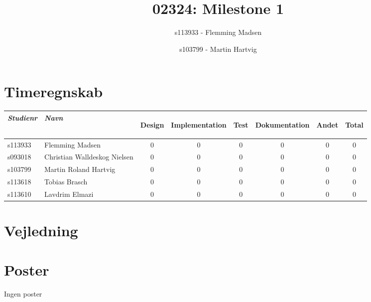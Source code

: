 \documentclass[a4paper]{article}
\title{02324: Milestone 1}
\author{
  s113933 - Flemming Madsen
  \and
    s103799 - Martin Hartvig
}
\begin{document}
\section*{Timeregnskab} %
\label{sec:Timeregnskab}
\begin{tabular}{l l | c c c c c | c}

  \emph{Studienr}& \emph{Navn} & \begin{sideways}Design\end{sideways} & \begin{sideways}Implementation\end{sideways} & \begin{sideways}Test\end{sideways} & \begin{sideways}Dokumentation\end{sideways} & \begin{sideways}Andet\end{sideways} & \begin{sideways}Total\end{sideways} \\
  \hline
   s113933 & Flemming Madsen & 0 & 0 & 0 & 0 & 0 & 0 \\
  s093018 & Christian Walldeskog Nielsen & 0 & 0 & 0 & 0 & 0 & 0 \\
  s103799 & Martin Roland Hartvig & 0 & 0 & 0 & 0 & 0 & 0 \\
  s113618 & Tobias Brasch & 0 & 0 & 0 & 0 & 0 & 0 \\
  s113610 & Lavdrim Elmazi & 0 & 0 & 0 & 0 & 0 & 0 \\
\end{tabular}


\clearpage



\section{Vejledning} %
\label{sec:Vejledning}


\clearpage

\section{Poster} %
\label{sec:Poster}

Ingen poster
\end{document}

